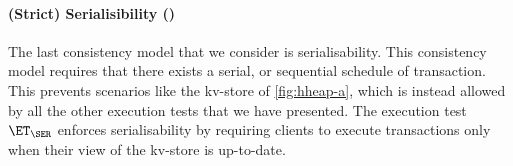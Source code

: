 \paragraph{(Strict) Serialisibility (\SER)}
The last consistency model that we consider is serialisability. This consistency model 
requires that there exists a serial, or sequential schedule of transaction. 
This prevents scenarios like the kv-store of \cref{fig:hheap-a}, which is instead allowed 
by all the other execution tests that we have presented.
The execution test $\ET_{\SER}$ enforces serialisability by requiring clients to 
execute transactions only when their view of the kv-store is up-to-date.

